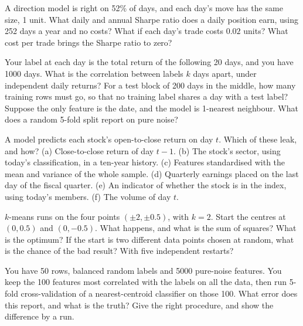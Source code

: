 \begin{question}\label{iq:iv1:machine-learning:27}
A direction model is right on 52\% of days, and each day's move has the same size, 1 unit. What daily and annual Sharpe ratio does a daily position earn, using 252 days a year and no costs? What if each day's trade costs $0.02$ units? What cost per trade brings the Sharpe ratio to zero?
\end{question}

\begin{question}\label{iq:iv1:machine-learning:28}
Your label at each day is the total return of the following 20 days, and you have 1000 days. What is the correlation between labels $k$ days apart, under independent daily returns? For a test block of 200 days in the middle, how many training rows must go, so that no training label shares a day with a test label? Suppose the only feature is the date, and the model is 1-nearest neighbour. What does a random 5-fold split report on pure noise?
\end{question}

\begin{question}\label{iq:iv1:machine-learning:29}
A model predicts each stock's open-to-close return on day $t$. Which of these leak, and how? (a) Close-to-close return of day $t - 1$. (b) The stock's sector, using today's classification, in a ten-year history. (c) Features standardised with the mean and variance of the whole sample. (d) Quarterly earnings placed on the last day of the fiscal quarter. (e) An indicator of whether the stock is in the index, using today's members. (f) The volume of day $t$.
\end{question}

\begin{question}\label{iq:iv1:machine-learning:30}
$k$-means runs on the four points $(\pm 2, \pm 0.5)$, with $k = 2$. Start the centres at $(0, 0.5)$ and $(0, -0.5)$. What happens, and what is the sum of squares? What is the optimum? If the start is two different data points chosen at random, what is the chance of the bad result? With five independent restarts?
\end{question}

\begin{question}\label{iq:iv1:machine-learning:31}
You have 50 rows, balanced random labels and 5000 pure-noise features. You keep the 100 features most correlated with the labels on all the data, then run 5-fold cross-validation of a nearest-centroid classifier on those 100. What error does this report, and what is the truth? Give the right procedure, and show the difference by a run.
\end{question}

